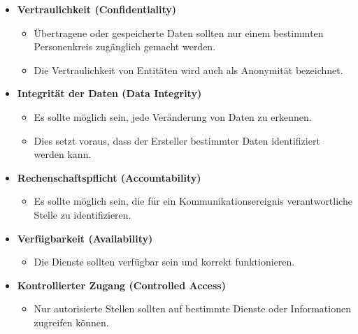 \documentclass[a4paper]{article}
\begin{document}
\begin{multicols}{3}
    \begin{itemize}
        \item
              \textbf{Vertraulichkeit (Confidentiality)}

              \begin{itemize}
                  \item
                        Übertragene oder gespeicherte Daten sollten nur einem bestimmten
                        Personenkreis zugänglich gemacht werden.
                  \item
                        Die Vertraulichkeit von Entitäten wird auch als Anonymität
                        bezeichnet.
              \end{itemize}
        \item
              \textbf{Integrität der Daten (Data Integrity)}

              \begin{itemize}
                  \item
                        Es sollte möglich sein, jede Veränderung von Daten zu erkennen.
                  \item
                        Dies setzt voraus, dass der Ersteller bestimmter Daten identifiziert
                        werden kann.
              \end{itemize}
        \item
              \textbf{Rechenschaftspflicht (Accountability)}

              \begin{itemize}
                  \item
                        Es sollte möglich sein, die für ein Kommunikationsereignis
                        verantwortliche Stelle zu identifizieren.
              \end{itemize}
        \item
              \textbf{Verfügbarkeit (Availability)}

              \begin{itemize}
                  \item
                        Die Dienste sollten verfügbar sein und korrekt funktionieren.
              \end{itemize}
        \item
              \textbf{Kontrollierter Zugang (Controlled Access)}

              \begin{itemize}
                  \item
                        Nur autorisierte Stellen sollten auf bestimmte Dienste oder
                        Informationen zugreifen können.
              \end{itemize}
    \end{itemize}



\end{multicols}
\end{document}
